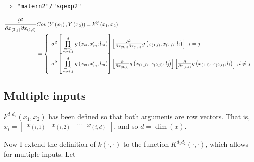 \documentclass{sfuthesis}
\begin{document}
\bigskip
{} $\Rightarrow$ \texttt{"matern2"/"sqexp2"}

\begin{align}
    \frac{{{\partial ^2}}}{{\partial {x_{\left( {2,j} \right)}}\partial {x_{\left( {1,i} \right)}}}} &Cov\left( {Y\left( {{x_1}} \right),Y\left( {{x_2}} \right)} \right) = {k^{ij}}\left( {{x_1},{x_2}} \right)\\
 &= \left\{ \begin{array}{l}
{\sigma ^2}\left[ {\prod\limits_{m = 1\atop
m \ne i,j}^d {g\left( {{x_m},x{'_m};{l_m}} \right)} } \right]\left[ {\frac{{{\partial ^2}}}{{\partial {x_{\left( {2,i} \right)}}\partial {x_{\left( {1,i} \right)}}}}g\left( {{x_{\left( {1,i} \right)}},{x_{\left( {2,i} \right)}};{l_i}} \right)} \right],i = j\\
{\sigma ^2}\left[ {\prod\limits_{m = 1\atop
m \ne i,j}^d {g\left( {{x_m},x{'_m};{l_m}} \right)} } \right]\left[ {\frac{\partial }{{\partial {x_{\left( {2,j} \right)}}}}g\left( {{x_{\left( {1,j} \right)}},{x_{\left( {2,j} \right)}};{l_j}} \right)} \right]\left[ {\frac{\partial }{{\partial {x_{\left( {1,i} \right)}}}}g\left( {{x_{\left( {1,i} \right)}},{x_{\left( {2,i} \right)}};{l_i}} \right)} \right],i \ne j
    \end{array} \right.
\end{align}


\pagebreak

\subsection{Multiple inputs}

$k^{d_1d_2}(x_1, x_2)$ has been defined so that both arguments are row vectors. 
That is,  
  ${x_i} = \left[ {\begin{array}{*{20}{c}}
{{x_{\left( {i,1} \right)}}}&{{x_{\left( {i,2} \right)}}}& \cdots &{{x_{\left( {i,d} \right)}}}
\end{array}} \right]$, and so $d = \dim(x)$. 

Now I extend the definition of $k(\cdot, \cdot)$ to the function $K^{d_1d_2}(\cdot, \cdot)$, which allows for multiple inputs. 
Let 
\end{document}

